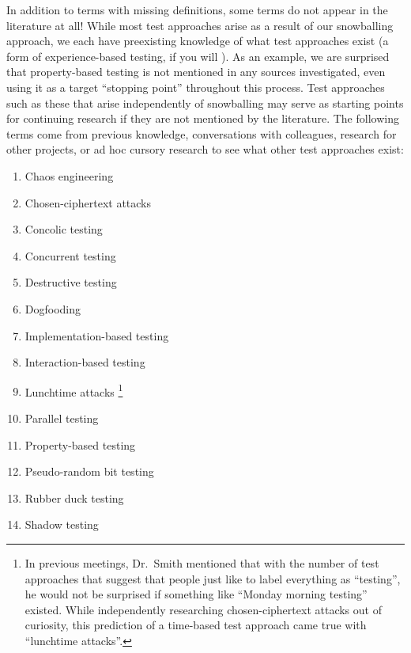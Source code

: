 \ifnotpaper
    
\fi

In addition to terms with missing definitions, some terms do not appear in
the literature at all! While most test approaches arise as a result of our
snowballing approach, we each have preexisting knowledge of what test
approaches exist (a form of experience-based testing, if you will%
).
As an example, we are surprised that property-based testing is not mentioned
in any sources investigated, even using it as a target ``stopping point''
throughout this process. Test approaches such as these that arise
independently of snowballing may serve as starting points for continuing
research if they are not mentioned by the literature. The following terms come
from previous knowledge, conversations with colleagues, research for other
projects, or ad hoc cursory research to see what other test approaches exist:
\ifnotpaper \begin{multicols}{2} \fi
        \begin{enumerate}
            \item Chaos engineering
            \item Chosen-ciphertext attacks
            \item Concolic testing
            \item Concurrent testing
            \item Destructive testing
            \item Dogfooding
            \item Implementation-based testing
            \item Interaction-based testing
            \item Lunchtime attacks\ifnotpaper%
                      \footnote{In previous meetings, Dr.~Smith mentioned
                          that with the number of test approaches that suggest
                          that people just like to label everything as
                          ``testing'', he would not be surprised if something
                          like ``Monday morning testing'' existed. While
                          independently researching chosen-ciphertext attacks
                          out of curiosity, this prediction of a time-based
                          test approach came true with ``lunchtime attacks''.}
                  \fi
            \item Parallel testing
            \item Property-based testing
            \item Pseudo-random bit testing
            \item Rubber duck testing
            \item Shadow testing
        \end{enumerate}
        \ifnotpaper \end{multicols} \fi
